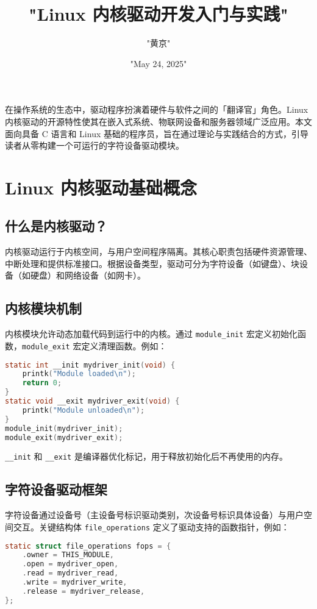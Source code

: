 \title{"Linux 内核驱动开发入门与实践"}
\author{"黄京"}
\date{"May 24, 2025"}
\maketitle
在操作系统的生态中，驱动程序扮演着硬件与软件之间的「翻译官」角色。Linux 内核驱动的开源特性使其在嵌入式系统、物联网设备和服务器领域广泛应用。本文面向具备 C 语言和 Linux 基础的程序员，旨在通过理论与实践结合的方式，引导读者从零构建一个可运行的字符设备驱动模块。\par
\chapter{Linux 内核驱动基础概念}
\section{什么是内核驱动？}
内核驱动运行于内核空间，与用户空间程序隔离。其核心职责包括硬件资源管理、中断处理和提供标准接口。根据设备类型，驱动可分为字符设备（如键盘）、块设备（如硬盘）和网络设备（如网卡）。\par
\section{内核模块机制}
内核模块允许动态加载代码到运行中的内核。通过 \verb!module_init! 宏定义初始化函数，\verb!module_exit! 宏定义清理函数。例如：\par
\begin{lstlisting}[language=c]
static int __init mydriver_init(void) {  
    printk("Module loaded\n");  
    return 0;  
}  
static void __exit mydriver_exit(void) {  
    printk("Module unloaded\n");  
}  
module_init(mydriver_init);  
module_exit(mydriver_exit);  
\end{lstlisting}
\verb!__init! 和 \verb!__exit! 是编译器优化标记，用于释放初始化后不再使用的内存。\par
\section{字符设备驱动框架}
字符设备通过设备号（主设备号标识驱动类别，次设备号标识具体设备）与用户空间交互。关键结构体 \verb!file_operations! 定义了驱动支持的函数指针，例如：\par
\begin{lstlisting}[language=c]
static struct file_operations fops = {  
    .owner = THIS_MODULE,  
    .open = mydriver_open,  
    .read = mydriver_read,  
    .write = mydriver_write,  
    .release = mydriver_release,  
};  
\end{lstlisting}
